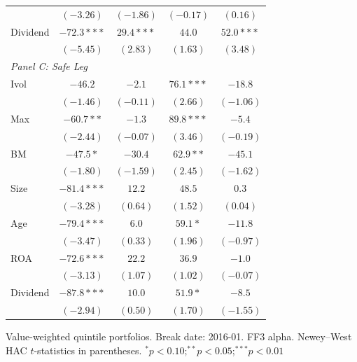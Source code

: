 \begin{tabular}{l c c c c}
 & $(-3.26)$ & $(-1.86)$ & $(-0.17)$ & $(0.16)$ \\
Dividend & $-72.3***$ & $29.4***$ & $44.0$ & $52.0***$ \\
 & $(-5.45)$ & $(2.83)$ & $(1.63)$ & $(3.48)$ \\
\midrule
\multicolumn{5}{l}{\textit{Panel C: Safe Leg}} \\
Ivol & $-46.2$ & $-2.1$ & $76.1***$ & $-18.8$ \\
 & $(-1.46)$ & $(-0.11)$ & $(2.66)$ & $(-1.06)$ \\
Max & $-60.7**$ & $-1.3$ & $89.8***$ & $-5.4$ \\
 & $(-2.44)$ & $(-0.07)$ & $(3.46)$ & $(-0.19)$ \\
BM & $-47.5*$ & $-30.4$ & $62.9**$ & $-45.1$ \\
 & $(-1.80)$ & $(-1.59)$ & $(2.45)$ & $(-1.62)$ \\
Size & $-81.4***$ & $12.2$ & $48.5$ & $0.3$ \\
 & $(-3.28)$ & $(0.64)$ & $(1.52)$ & $(0.04)$ \\
Age & $-79.4***$ & $6.0$ & $59.1*$ & $-11.8$ \\
 & $(-3.47)$ & $(0.33)$ & $(1.96)$ & $(-0.97)$ \\
ROA & $-72.6***$ & $22.2$ & $36.9$ & $-1.0$ \\
 & $(-3.13)$ & $(1.07)$ & $(1.02)$ & $(-0.07)$ \\
Dividend & $-87.8***$ & $10.0$ & $51.9*$ & $-8.5$ \\
 & $(-2.94)$ & $(0.50)$ & $(1.70)$ & $(-1.55)$ \\
\bottomrule
\end{tabular}
\vspace{4pt}
\begin{minipage}{0.9\textwidth}
\footnotesize
Value-weighted quintile portfolios. Break date: 2016-01. FF3 alpha.
Newey--West HAC $t$-statistics in parentheses.
$^{*}p<0.10$;\quad $^{**}p<0.05$;\quad $^{***}p<0.01$
\end{minipage}